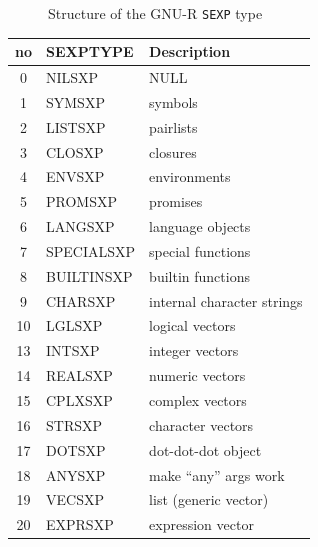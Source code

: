 \begin{figure}
	\centering
	\begin{adjustbox}{trim=5pt 20pt 0 40pt, clip}
	\end{adjustbox}
	\caption{Structure of the GNU-R \texttt{SEXP} type}\label{fig:sexp-struct}
\end{figure}

\begin{table}[h!]
	\begin{tabular}{c l l}
		\textbf{no} & \textbf{SEXPTYPE} & \textbf{Description}       \\
		\hline
		0           & NILSXP            & NULL                       \\
		1           & SYMSXP            & symbols                    \\
		2           & LISTSXP           & pairlists                  \\
		3           & CLOSXP            & closures                   \\
		4           & ENVSXP            & environments               \\
		5           & PROMSXP           & promises                   \\
		6           & LANGSXP           & language objects           \\
		7           & SPECIALSXP        & special functions          \\
		8           & BUILTINSXP        & builtin functions          \\
		9           & CHARSXP           & internal character strings \\
		10          & LGLSXP            & logical vectors            \\
		13          & INTSXP            & integer vectors            \\
		14          & REALSXP           & numeric vectors            \\
		15          & CPLXSXP           & complex vectors            \\
		16          & STRSXP            & character vectors          \\
		17          & DOTSXP            & dot-dot-dot object         \\
		18          & ANYSXP            & make “any” args work       \\
		19          & VECSXP            & list (generic vector)      \\
		20          & EXPRSXP           & expression vector          \\

\end{tabular}
\end{table}
